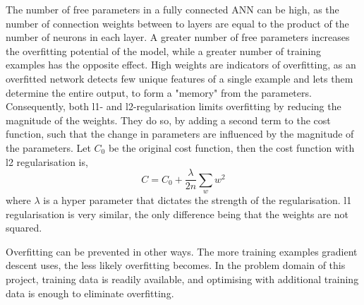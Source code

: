 The number of free parameters in a fully connected ANN can be high, as the number of connection weights between to layers are equal to the product of the number of neurons in each layer. A greater number of free parameters increases the overfitting potential of the model, while a greater number of training examples has the opposite effect.
High weights are indicators of overfitting, as an overfitted network detects few unique features of a single example and lets them determine the entire output, to form a "memory" from the parameters. Consequently, both l1- and l2-regularisation limits overfitting by reducing the magnitude of the weights. They do so, by adding a second term to the cost function, such that the change in parameters are influenced by the magnitude of the parameters. Let $C_0$ be the original cost function, then the cost function with l2 regularisation is,
$$C = C_0 + \frac{\lambda}{2n}\sum_{w} w^2 $$
where $\lambda$ is a hyper parameter that dictates the strength of the regularisation. l1 regularisation is very similar, the only difference being that the weights are not squared.

Overfitting can be prevented in other ways. The more training examples gradient descent uses, the less likely overfitting becomes. In the problem domain of this project, training data is readily available, and optimising with additional training data is enough to eliminate overfitting.

